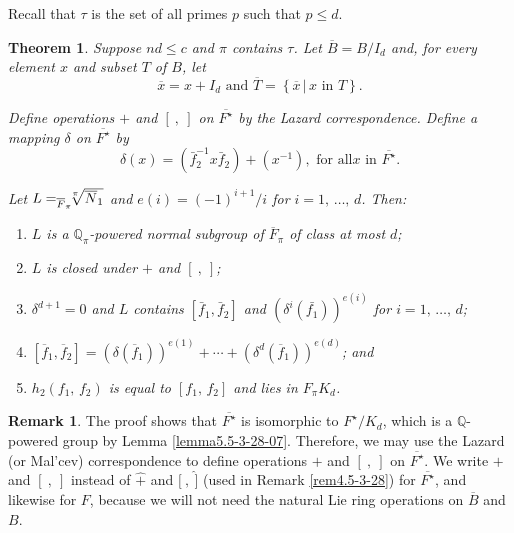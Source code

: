 \documentclass[mathscr]{amsart}
\theoremstyle{theorem}
\newtheorem{theorem}{Theorem}[section]
\theoremstyle{definition}
\newtheorem*{remarknn}{Remark}
\numberwithin{equation}{section}
\def \({\left(}
\def \){\right)}
\begin{document}
Recall that $\tau$ is the set of all primes $p$ such that $p\leq d$.

\begin{theorem}\label{theo5.8-3-30}
Suppose $nd\leq c$ and $\pi$ contains $\tau$.  Let $\overline
B=B/I_d$ and, for every element $x$ and subset $T$ of $B$, let
$$
\overline x=x+I_d\text{ and }\overline T=\left\{\overline x \, |\,
x\text{ in }T\right\}.
$$

Define operations $+$ and $\left[~,~\right]$ on $\overline{F^\star}$
by the Lazard correspondence.  Define a mapping $\delta$ on
$\overline{F^\star}$ by
$$
\delta(x)=\(\bar f_2^{-1}x\bar{f}_2\)+\(x^{-1}\),\text{ for all
}x\text{ in }\overline {F^\star}.
$$

Let $L=_{\overline F_\pi}\hspace*{-0.2cm}\sqrt[\pi]{\overline N_1}$
and $e(i)=(-1)^{i+1}/i$ for $i=1,\,\dots,\,d$.  Then:
\begin{enumerate}
\item[(a)] $L$ is a $\mathbb{Q}_\pi$-powered normal subgroup of
$\overline F_\pi$ of class at most $d$;
\item[(b)] $L$ is closed under $+$ and $\left[~,~\right]$;
\item[(c)] $\delta^{d+1}=0$ and $L$ contains $\left[\bar
f_1,\bar f_2\right]$ and $\(\delta^i\(\bar{f_1}\)\)^{e(i)}$ for
$i=1,\,\dots,\,d$;
\item[(d)] $\left[\overline f_1,\overline
f_2\right]=\(\delta\(\overline f_1\)\)^{e(1)}+\cdots +
\(\delta^d\(\overline f_1\)\)^{e(d)}$; and
\item[(e)]$h_2\(f_1,\,f_2\)$ is equal to $\left[f_1,\,f_2\right]$
and lies in $F_\pi K_d$.
\end{enumerate}
\end{theorem}

\begin{remarknn}%
The proof shows that $\overline{F^\star}$ is isomorphic to
$F^\star/K_d$, which is a $\mathbb{Q}$-powered group by Lemma
\ref{lemma5.5-3-28-07}.  Therefore, we may use the Lazard (or
Mal'cev) correspondence to define operations $+$ and $[~,~]$ on
$\overline{F^\star}$.  We write $+$ and $[~,~]$ instead of $\hat +$
and $\hat[~,~\hat]$ (used in Remark \ref{rem4.5-3-28}) for
$\overline{F^\star}$, and likewise for $F$, because we will not need
the natural Lie ring operations on $\overline B$ and $B$.
\end{remarknn}
\end{document}
